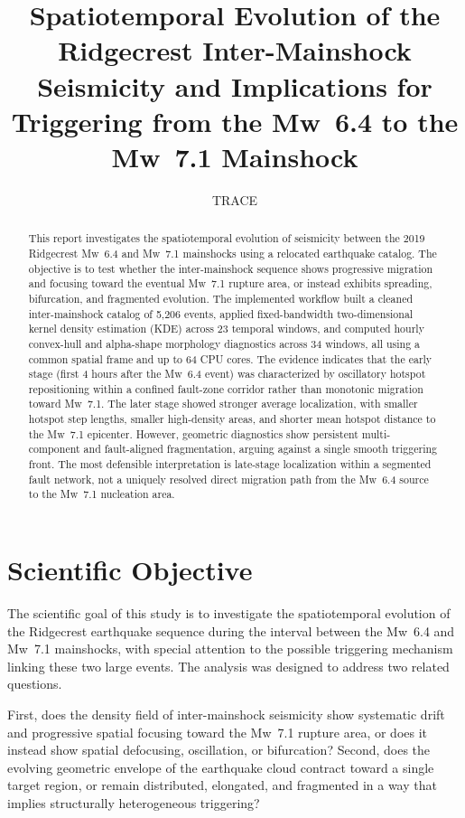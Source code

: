 \documentclass[11pt]{article}
\title{Spatiotemporal Evolution of the Ridgecrest Inter-Mainshock Seismicity and Implications for Triggering from the Mw~6.4 to the Mw~7.1 Mainshock}
\author{TRACE}
\date{}
\begin{document}
\maketitle

\begin{abstract}
This report investigates the spatiotemporal evolution of seismicity between the 2019 Ridgecrest Mw~6.4 and Mw~7.1 mainshocks using a relocated earthquake catalog. The objective is to test whether the inter-mainshock sequence shows progressive migration and focusing toward the eventual Mw~7.1 rupture area, or instead exhibits spreading, bifurcation, and fragmented evolution. The implemented workflow built a cleaned inter-mainshock catalog of 5,206 events, applied fixed-bandwidth two-dimensional kernel density estimation (KDE) across 23 temporal windows, and computed hourly convex-hull and alpha-shape morphology diagnostics across 34 windows, all using a common spatial frame and up to 64 CPU cores. The evidence indicates that the early stage (first 4 hours after the Mw~6.4 event) was characterized by oscillatory hotspot repositioning within a confined fault-zone corridor rather than monotonic migration toward Mw~7.1. The later stage showed stronger average localization, with smaller hotspot step lengths, smaller high-density areas, and shorter mean hotspot distance to the Mw~7.1 epicenter. However, geometric diagnostics show persistent multi-component and fault-aligned fragmentation, arguing against a single smooth triggering front. The most defensible interpretation is late-stage localization within a segmented fault network, not a uniquely resolved direct migration path from the Mw~6.4 source to the Mw~7.1 nucleation area.
\end{abstract}

\section{Scientific Objective}
The scientific goal of this study is to investigate the spatiotemporal evolution of the Ridgecrest earthquake sequence during the interval between the Mw~6.4 and Mw~7.1 mainshocks, with special attention to the possible triggering mechanism linking these two large events. The analysis was designed to address two related questions.

First, does the density field of inter-mainshock seismicity show systematic drift and progressive spatial focusing toward the Mw~7.1 rupture area, or does it instead show spatial defocusing, oscillation, or bifurcation? Second, does the evolving geometric envelope of the earthquake cloud contract toward a single target region, or remain distributed, elongated, and fragmented in a way that implies structurally heterogeneous triggering?
\end{document}
